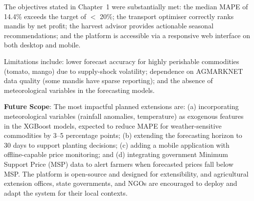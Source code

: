 \documentclass[12pt,a4paper]{report}
\begin{document}
The objectives stated in Chapter~1 were substantially met: the median MAPE of 14.4\%
exceeds the target of $<$ 20\%; the transport optimiser correctly ranks mandis by net
profit; the harvest advisor provides actionable seasonal recommendations; and the platform
is accessible via a responsive web interface on both desktop and mobile.

Limitations include: lower forecast accuracy for highly perishable commodities (tomato,
mango) due to supply-shock volatility; dependence on AGMARKNET data quality (some mandis
have sparse reporting); and the absence of meteorological variables in the forecasting
models.

\textbf{Future Scope}: The most impactful planned extensions are: (a) incorporating
meteorological variables (rainfall anomalies, temperature) as exogenous features in the
XGBoost models, expected to reduce MAPE for weather-sensitive commodities by 3--5
percentage points; (b) extending the forecasting horizon to 30 days to support planting
decisions; (c) adding a mobile application with offline-capable price monitoring;
and (d) integrating government Minimum Support Price (MSP) data to alert farmers when
forecasted prices fall below MSP. The platform is open-source and designed for
extensibility, and agricultural extension offices, state governments, and NGOs are
encouraged to deploy and adapt the system for their local contexts.
\end{document}

